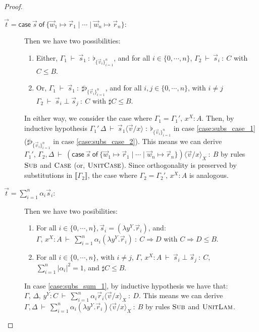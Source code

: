 \documentclass[a4paper,UKenglish,numberwithinsect,pdfa,anonymous]{lipics-v2021}
\theoremstyle{restatestyle}
\newcommand\ansubst[2]{\ensuremath{\langle #1 \rangle_{#2}}}
\def\Lam#1#2#3{\lambda#1^{#2}{.}#3} %
\def\gencase#1#2#3#4#5{\ensuremath{\mathsf{case}~#1~\mathsf{of}~\{#2\mapsto #4 \mid \dotsb \mid #3\mapsto #5\}}}
\def\Arr{\Rightarrow}
\def\sem#1{\llbracket#1\rrbracket}
\def\TYP#1#2#3{#1~{\vdash}~#2~{:}~#3}
\def\SORTH#1#2#3#4{#1~{\vdash}~#2\perp#3~{:}~#4}
\newcommand\basis[1]{\ensuremath{\flat_{#1}}}
\begin{document}
\begin{proof}
\begin{description}
    \item[$\vec{t}=\gencase{\vec{s}}{\vec{w}_{1}}{\vec{w}_{n}}{\vec{r}_{1}}{\vec{r}_{n}}$:] Then we have two possibilities:
    \begin{enumerate}
      \item\label{case:subs_case_1} Either, $\TYP{\Gamma_1}{\vec{s}_{1}}{\basis{\{\vec{v}_{i}\}_{i=1}^n}}$, and for all $i\in\{0,\dotsb,n\}$, $\TYP{\Gamma_2}{\vec{s}_{i}}{C}$ with $C\leq B$.
      \item\label{case:subs_case_2} Or, $\TYP{\Gamma_1}{\vec{s}_{1}}{\sharp\basis{\{\vec{v}_{i}\}_{i=1}^n}}$, and for all $i,j\in\{0,\dotsb,n\}$, with $i\neq j$ $\SORTH{\Gamma_2}{\vec{s}_{i}}{\vec{s}_{j}}{C}$ with $\sharp C\leq B$.
    \end{enumerate}
    In either way, we consider the case where $\Gamma_1 = \Gamma_1',\,x^{X}\!:\!A$. Then, by inductive hypothesis $\TYP{\Gamma_1'\,\Delta}{\vec{s}_{1}\ansubst{\vec{v}/x}{}}{\basis{\{\vec{v}_{i}\}_{i=1}^n}}$ in case \ref{case:subs_case_1} ($\sharp \basis{\{\vec{v}_{i}\}_{i=1}^n}$ in case \ref{case:subs_case_2}). This means we can derive $\TYP{\Gamma_1',\,\Gamma_2,\Delta}{(\gencase{\vec{s}}{\vec{w}_{1}}{\vec{w}_{n}}{\vec{r}_{1}}{\vec{r}_{n}})\ansubst{\vec{v}/x}{X}}{B}$ by rules $\textsc{Sub}$ and $\textsc{Case}$ (or, $\textsc{UnitCase}$). Since orthogonality is preserved by substitutions in $\sem{\Gamma_2}$, the case where $\Gamma_2 = \Gamma_2',\,x^{X}\!:\!A$ is analogous.

    \item[$\vec{t}=\sum_{i=1}^{n}\alpha_i \vec{s}_{i}$:] Then we have two posibilities:
    \begin{enumerate}
      \item\label{case:subs_sum_1} For all $i\in\{0,\dotsb, n\}, \vec{s}_{i}=(\Lam{y}{Y}{\vec{r}_{i}})$, and:\\
      $\TYP{\Gamma,\,x^{X}\!:\!A}{\sum_{i=1}^{n}\alpha_i(\Lam{y}{Y}{\vec{r}_{i}})}{C\Arr D}$ with $C\Arr D\leq B$.
      \item\label{case:subs_sum_2} For all $i\in\{0,\dotsb, n\}$, with $i\neq j$, $\SORTH{\Gamma,\,x^{X}\!:\!A}{\vec{s}_{i}}{\vec{s}_{j}}{C}$, $\sum_{i=1}^{n}|\alpha_i|^2=1$, and $\sharp C\leq B$.
    \end{enumerate}
    
    In case \ref{case:subs_sum_1}, by inductive hypothesis we have that:\\
    $\TYP{\Gamma,\,\Delta,\,y^{Y}\!:\!C}{\sum_{i=1}^{n}\alpha_i \vec{r}_{i}\ansubst{\vec{v}/x}{X}}{D}$. This means we can derive \\$\TYP{\Gamma,\Delta}{\sum_{i=1}^{n}\alpha_i (\Lam{y}{Y}{\vec{r}_{i}})\ansubst{\vec{v}/x}{X}}{B}$ by rules $\textsc{Sub}$ and $\textsc{UnitLam}$.


\end{description}
\end{proof}
\end{document}
